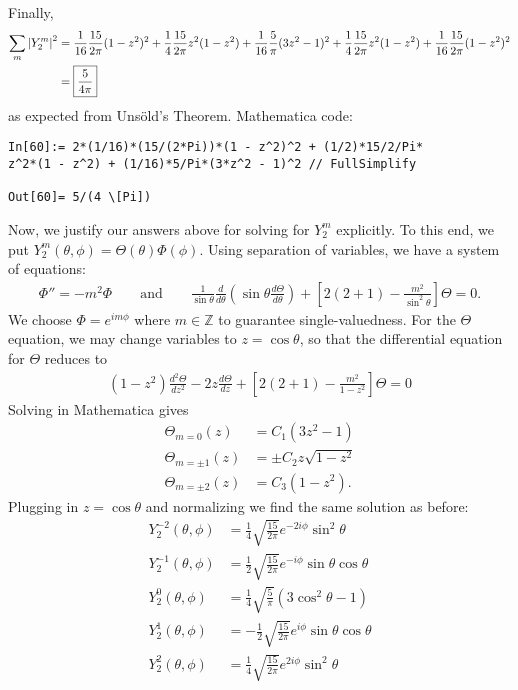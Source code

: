 \documentclass{article}
\theoremstyle{definition}
\newcommand{\f}[2]{\frac{#1}{#2}}
\newcommand{\lp}{\left(}
\newcommand{\rp}{\right)}
\newcommand{\lb}{\left[}
\newcommand{\rb}{\right]}
\begin{document}
Finally,
\begin{align*}
\sum_m \abs{Y^m_2}^2 &= \f{1}{16} \f{15}{2\pi}(1-z^2)^2 + \f{1}{4}\f{15}{2\pi} z^2(1-z^2) + \f{1}{16}\f{5}{\pi} (3z^2-1)^2 + \f{1}{4}\f{15}{2\pi} z^2(1-z^2) + \f{1}{16} \f{15}{2\pi}(1-z^2)^2 \\
&= \boxed{\f{5}{4\pi}}
\end{align*}
as expected from Uns\"{o}ld's Theorem. Mathematica code:
\begin{lstlisting}
In[60]:= 2*(1/16)*(15/(2*Pi))*(1 - z^2)^2 + (1/2)*15/2/Pi*
z^2*(1 - z^2) + (1/16)*5/Pi*(3*z^2 - 1)^2 // FullSimplify

Out[60]= 5/(4 \[Pi])
\end{lstlisting}

Now, we justify our answers above for solving for $Y^m_2$ explicitly. To this end, we put $Y^m_2(\theta,\phi) = \Theta(\theta)\Phi(\phi)$. Using separation of variables, we have a system of equations:
\begin{align*}
\Phi'' = -m^2\Phi \quad\quad \text{and}\quad\quad 
\f{1}{\sin\theta}\f{d}{d\theta}\lp \sin\theta\f{d\Theta}{d\theta} \rp + \lb 2(2+1) - \f{m^2}{\sin^2\theta} \rb\Theta = 0.
\end{align*}
We choose $\Phi = e^{im\phi}$ where $m\in\mathbb{Z}$ to guarantee single-valuedness. For the $\Theta$ equation, we may change variables to $z = \cos\theta$, so that the differential equation for $\Theta$ reduces to 
\begin{align*}
(1-z^2)\f{d^2\Theta}{dz^2} -2z \f{d\Theta}{dz} + \lb 2(2+1) - \f{m^2}{1-z^2} \rb\Theta = 0
\end{align*}
Solving in Mathematica gives
\begin{align*}
\Theta_{m=0}(z) &= C_1(3z^2-1) \\
\Theta_{m=\pm 1}(z) &= \pm C_2 z\sqrt{1 - z^2} \\
\Theta_{m=\pm 2}(z) &= C_3(1-z^2).
\end{align*}
Plugging in $z=\cos\theta$ and normalizing we find the same solution as before:
\begin{align*}
Y^{-2}_2(\theta,\phi) &= \frac{1}{4} \sqrt{\frac{15}{2 \pi }} e^{-2 i \phi } \sin ^2\theta  \\
Y^{-1}_2(\theta,\phi) &= \frac{1}{2} \sqrt{\frac{15}{2 \pi }} e^{-i \phi } \sin \theta  \cos \theta \\
Y^{0}_2(\theta,\phi) &= \frac{1}{4} \sqrt{\frac{5}{\pi }} \left(3 \cos ^2\theta -1\right)
 \\
Y^{1}_2(\theta,\phi) &= -\frac{1}{2} \sqrt{\frac{15}{2 \pi }} e^{i \phi } \sin \theta  \cos \theta \\
Y^{2}_2(\theta,\phi) &= \frac{1}{4} \sqrt{\frac{15}{2 \pi }} e^{2 i \phi } \sin ^2\theta 
\end{align*}
\end{document}
